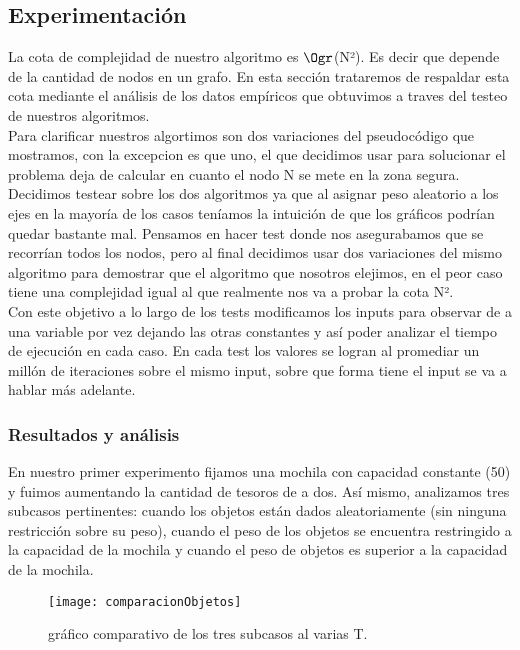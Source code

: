 \documentclass[spanish,12pt]{article}
\begin{document}
\subsection{Experimentación}

La cota de complejidad de nuestro algoritmo es $\Ogr$(N²). Es decir que depende de la cantidad de nodos en un grafo.
En esta sección trataremos de respaldar esta cota mediante el análisis de los datos empíricos que obtuvimos a traves del testeo de nuestros algoritmos.
\\
Para clarificar nuestros algortimos son dos variaciones del pseudocódigo que mostramos, con la excepcion es que uno, el que decidimos usar para solucionar el problema deja de calcular en cuanto el nodo N se mete en la zona segura. Decidimos testear sobre los dos algoritmos ya que al asignar peso aleatorio a los ejes en la mayoría de los casos teníamos la intuición de que los gráficos podrían quedar bastante mal. Pensamos en hacer test donde nos asegurabamos que se recorrían todos los nodos, pero al final decidimos usar dos variaciones del mismo algoritmo para demostrar que el algoritmo que nosotros elejimos, en el peor caso tiene una complejidad igual al que realmente nos va a probar la cota N².
\\  
Con este objetivo a lo largo de los tests modificamos los inputs para observar de a una variable por vez dejando las otras constantes y así poder analizar el tiempo de ejecución en cada caso. En cada test los valores se logran al promediar un millón de iteraciones sobre el mismo input, sobre que forma tiene el input se va a hablar más adelante.

\subsubsection{Resultados y análisis}

En nuestro primer experimento fijamos una mochila con capacidad constante (50) y fuimos aumentando la cantidad de tesoros de a dos.
Así mismo, analizamos tres subcasos pertinentes: cuando los objetos están dados aleatoriamente (sin ninguna restricción sobre su peso), cuando el peso de los objetos se encuentra restringido a la capacidad de la mochila y cuando el peso de objetos es superior a la capacidad de la mochila.

\begin{figure}[H]
\centering
\texttt{[image: comparacionObjetos]}
\caption{gráfico comparativo de los tres subcasos al varias T.}
\end{figure}
\end{document}
